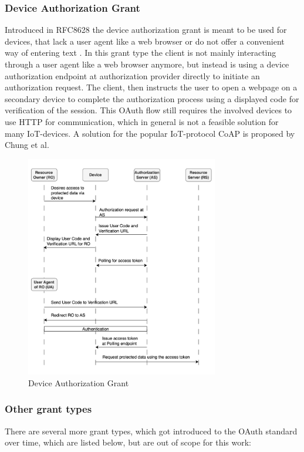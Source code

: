 \documentclass[
    fontsize=12pt,
    headings=small,
    parskip=half,           %
    bibliography=totoc,
    numbers=noenddot,       %
    open=any,               %
    ]{scrreprt}
\begin{document}
\subsubsection{Device Authorization Grant}
Introduced in RFC8628 the device authorization grant is meant to be used for
devices, that lack a user agent like a web browser or do not offer a convenient
way of entering text \cite{denniss2019oauth}. In this grant type the client is
not mainly interacting through a user agent like a web browser anymore, but instead is using a device authorization endpoint at authorization provider directly to initiate an authorization request. The client, then instructs the user to open a webpage on a secondary device to complete the authorization process using a displayed code for verification of the session. This OAuth flow still requires the involved devices to use HTTP for communication, which in general is not a feasible solution for many IoT-devices. A solution for the popular IoT-protocol CoAP is proposed by Chung et al. 

\begin{figure}[ht]
	\sffamily\footnotesize
	\includegraphics[width=0.75\textwidth]{pic/device_authorization_grant.png}
	\unitlength=0.75mm
	\linethickness{0.4pt}
	\caption{Device Authorization Grant}
	\label{fig:device_authorization_grant}
\end{figure}

\subsubsection{Other grant types}
There are several more grant types, which got introduced to the OAuth standard
over time, which are listed below, but are out of scope for this work: 
\end{document}
